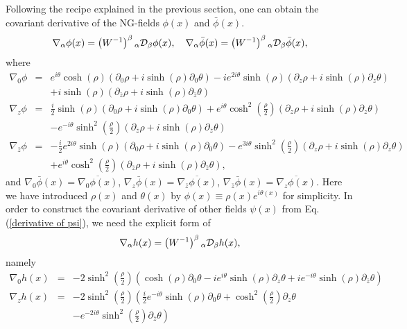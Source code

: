 \documentclass[a4paper,12pt]{article}
\begin{document}
Following the recipe explained in the previous section, one can
obtain the covariant derivative of the NG-fields $\phi(x)$ and
$\bar{\phi}(x)$.
\begin{eqnarray}
\nabla_{\alpha} \phi(x) = \left( W^{-1} \right)^{\beta}{}_{\alpha}
{\cal D}_{\beta} \phi(x), \quad \nabla_{\alpha}\bar{\phi}(x) 
= \left( W^{-1} \right)^{\beta}{}_{\alpha} {\cal D}_{\beta}
\bar{\phi}(x),
\end{eqnarray}
where
\begin{eqnarray}
\nabla_{0}\phi &=& e^{i \theta} \cosh(\rho)(\partial_{0} \rho + i \sinh(\rho)
\partial_{0} \theta) -i e^{2 i \theta} \sinh(\rho) (\partial_{z} \rho 
+ i \sinh(\rho) \partial_{z}\theta) \nonumber \\ &&
+ i \sinh(\rho) (\partial_{\bar{z}} \rho + 
i \sinh(\rho) \partial_{\bar{z}}\theta) \\
\nabla_{z}\phi &=& \frac{i}{2} \sinh(\rho)
(\partial_{0} \rho + i \sinh(\rho)
\partial_{0} \theta) + e^{i \theta} \cosh^{2}(\frac{\rho}{2}) 
(\partial_{z} \rho + i \sinh(\rho) \partial_{z}\theta) \nonumber \\ &&
- e^{-i \theta} \sinh^{2}(\frac{\rho}{2}) 
(\partial_{\bar{z}} \rho + i \sinh(\rho) \partial_{\bar{z}
}\theta) \\
\nabla_{\bar{z}}\phi &=&-\frac{i}{2} e^{2 i \theta} \sinh(\rho)
(\partial_{0} \rho + i \sinh(\rho)
\partial_{0} \theta) - e^{3 i \theta} \sinh^{2}(\frac{\rho}{2})
 (\partial_{z} \rho + i \sinh(\rho) \partial_{z}\theta) \nonumber \\ &&
+ e^{i \theta} \cosh^{2}(\frac{\rho}{2}) 
(\partial_{\bar{z}} \rho + i \sinh(\rho) \partial_{\bar{z}
}\theta),
\end{eqnarray}
and $\nabla_{0}\bar{\phi}(x) = \overline{\nabla_{0} \phi (x)}$,
$\nabla_{z} \bar{\phi}(x) = \overline{\nabla_{\bar{z}}\phi(x)}$, 
$\nabla_{\bar{z}} \bar{\phi}(x) = \overline{\nabla_{z}\phi(x)}$.
Here we have introduced $\rho(x)$ and $\theta(x)$ by 
$\phi(x) \equiv \rho(x) e^{i \theta(x)}$ for simplicity. 
In order to construct the covariant derivative of 
other fields $\psi(x)$ from Eq. (\ref{derivative of psi}), 
we need the explicit form of 
\begin{eqnarray}
\nabla_{\alpha}h(x) = \left( W^{-1} \right)^{\beta}{}_{\alpha} 
{\cal D}_{\beta} h(x), \label{derivative of h}
\end{eqnarray}
namely
\begin{eqnarray}
\nabla_{0}h(x) &=& -2 \sinh^{2} (\frac{\rho}{2} ) \left( \cosh(\rho) 
\partial_{0} \theta - i e^{i \theta} \sinh(\rho) \partial_{z} \theta
+ i e^{-i \theta} \sinh(\rho) \partial_{\bar{z}} \theta \right) \\
\nabla_{z} h(x) &=& -2 \sinh^{2} (\frac{\rho}{2} ) 
\left(\frac{i}{2} e^{-i \theta} \sinh (\rho) \partial_{0} \theta 
+ \cosh^{2} (\frac{\rho}{2} ) 
\partial_{z} \theta \right. \nonumber \\ && \left. - e^{-2i \theta} 
\sinh^{2} ( \frac{\rho}{2} ) \partial_{\bar{z}} \theta \right)
\end{eqnarray}
\end{document}
